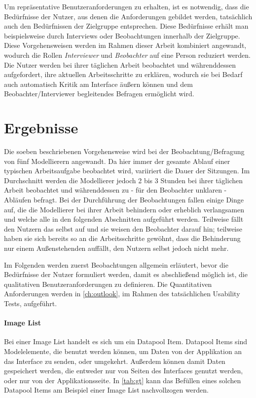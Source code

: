 Um repräsentative Benutzeranforderungen zu erhalten, ist es notwendig, dass die Bedürfnisse der Nutzer, aus denen die Anforderungen gebildet werden, tatsächlich auch den Bedürfnissen der Zielgruppe entsprechen.
Diese Bedürfnisse erhält man beispielsweise durch Interviews oder Beobachtungen innerhalb der Zielgruppe.
Diese Vorgehensweisen werden im Rahmen dieser Arbeit kombiniert angewandt, wodurch die Rollen \textit{Interviewer} und \textit{Beobachter} auf eine Person reduziert werden.
Die Nutzer werden bei ihrer täglichen Arbeit beobachtet und währenddessen aufgefordert, ihre aktuellen Arbeitsschritte zu erklären, wodurch sie bei Bedarf auch automatisch Kritik am Interface äußern können und dem Beobachter/Interviewer begleitendes Befragen ermöglicht wird.

\section{Ergebnisse}
\label{ch:results}
Die soeben beschriebenen Vorgehensweise wird bei der Beobachtung/Befragung von fünf Modellierern angewandt.
Da hier immer der gesamte Ablauf einer typischen Arbeitsaufgabe beobachtet wird, variiriert die Dauer der Sitzungen.
Im Durchschnitt werden die Modellierer jedoch 2 bis 3 Stunden bei ihrer täglichen Arbeit beobachtet und währenddessen zu - für den Beobachter unklaren - Abläufen befragt.
Bei der Durchführung der Beobachtungen fallen einige Dinge auf, die die Modellierer bei ihrer Arbeit behindern oder erheblich verlangsamen und welche alle in den folgenden Abschnitten aufgeführt werden.
Teilweise fällt den Nutzern das selbst auf und sie weisen den Beobachter darauf hin; teilweise haben sie sich bereits so an die Arbeitsschritte gewöhnt, dass die Behinderung nur einem Außenstehenden auffällt, den Nutzern selbst jedoch nicht mehr.

Im Folgenden werden zuerst Beobachtungen allgemein erläutert, bevor die Bedürfnisse der Nutzer formuliert werden, damit es abschließend möglich ist, die qualitativen Benutzeranforderungen zu definieren.
Die Quantitativen Anforderungen werden in \cref{ch:outlook}, im Rahmen des tatsächlichen Usability Tests, aufgeführt.

\paragraph{Image List}
Bei einer Image List handelt es sich um ein Datapool Item. 
Datapool Items sind Modelelemente, die benutzt werden können, um Daten von der Applikation an das Interface zu senden, oder umgekehrt.
Außerdem können damit Daten gespeichert werden, die entweder nur von Seiten des Interfaces genutzt werden, oder nur von der Applikationsseite\cite{studio_guide}.
In \cref{tab:gt} kann das Befüllen eines solchen Datapool Items am Beispiel einer Image List nachvollzogen werden.

